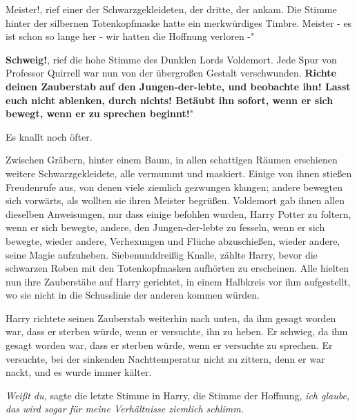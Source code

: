 \glqq{}Meister!\grqq{}, rief einer der Schwarzgekleideten, der dritte, der ankam.
Die Stimme hinter der silbernen Totenkopfmaske hatte ein merkwürdiges Timbre.
\glqq{}Meister - es ist schon so lange her - wir hatten die Hoffnung verloren -"

\glqq{}\textbf{Schweig!}\grqq{}, rief die hohe Stimme des Dunklen Lords
Voldemort. Jede Spur von Professor Quirrell war nun von der übergroßen Gestalt
verschwunden. \glqq{}\textbf{Richte deinen Zauberstab auf den Jungen-der-lebte,
und beobachte ihn! Lasst euch nicht ablenken, durch nichts! Betäubt ihn sofort,
wenn er sich bewegt, wenn er zu sprechen beginnt!}"

Es knallt noch öfter.

Zwischen Gräbern, hinter einem Baum, in allen schattigen Räumen erschienen
weitere Schwarzgekleidete, alle vermummt und maskiert. Einige von ihnen stießen
Freudenrufe aus, von denen viele ziemlich gezwungen klangen; andere bewegten
sich vorwärts, als wollten sie ihren Meister begrüßen. Voldemort gab ihnen allen
dieselben Anweisungen, nur dass einige befohlen wurden, Harry Potter zu foltern,
wenn er sich bewegte, andere, den Jungen-der-lebte zu fesseln, wenn er sich
bewegte, wieder andere, Verhexungen und Flüche abzuschießen, wieder andere,
seine Magie aufzuheben. Siebenunddreißig Knalle, zählte Harry, bevor die
schwarzen Roben mit den Totenkopfmasken aufhörten zu erscheinen. Alle hielten
nun ihre Zauberstäbe auf Harry gerichtet, in einem Halbkreis vor ihm
aufgestellt, wo sie nicht in die Schusslinie der anderen kommen würden.

Harry richtete seinen Zauberstab weiterhin nach unten, da ihm gesagt worden war,
dass er sterben würde, wenn er versuchte, ihn zu heben. Er schwieg, da ihm
gesagt worden war, dass er sterben würde, wenn er versuchte zu sprechen. Er
versuchte, bei der sinkenden Nachttemperatur nicht zu zittern, denn er war
nackt, und es wurde immer kälter.

\emph{Weißt du,} sagte die letzte Stimme in Harry, die Stimme der Hoffnung,
\emph{ich glaube, das wird sogar für meine Verhältnisse ziemlich schlimm.}

